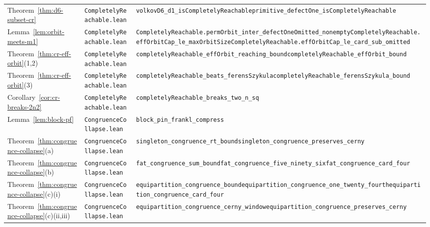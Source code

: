 \documentclass[11pt,a4paper]{article}
\theoremstyle{definition}
\theoremstyle{remark}
\begin{document}
\begin{table}[ht]
\begin{tabular}{@{}>{\raggedright\arraybackslash}p{2.75cm}>{\raggedright\arraybackslash}p{3.65cm}>{\raggedright\arraybackslash}p{9.05cm}@{}}
\midrule
Theorem~\ref{thm:d6-subset-cr} & \texttt{CompletelyReachable.lean} & \texttt{volkovD6\_d1\_isCompletelyReachable}\newline \texttt{primitive\_defectOne\_isCompletelyReachable} \\
Lemma~\ref{lem:orbit-meets-m1} & \texttt{CompletelyReachable.lean} & \texttt{CompletelyReachable.permOrbit\_inter\_defectOneOmitted\_nonempty}\newline \texttt{CompletelyReachable.effOrbitCap\_le\_maxOrbitSize}\newline \texttt{CompletelyReachable.effOrbitCap\_le\_card\_sub\_omitted} \\
Theorem~\ref{thm:cr-eff-orbit}(1,2) & \texttt{CompletelyReachable.lean} & \texttt{completelyReachable\_effOrbit\_reaching\_bound}\newline \texttt{completelyReachable\_effOrbit\_bound} \\
Theorem~\ref{thm:cr-eff-orbit}(3) & \texttt{CompletelyReachable.lean} & \texttt{completelyReachable\_beats\_ferensSzykula}\newline \texttt{completelyReachable\_ferensSzykula\_bound} \\
Corollary~\ref{cor:cr-breaks-2n2} & \texttt{CompletelyReachable.lean} & \texttt{completelyReachable\_breaks\_two\_n\_sq} \\
\midrule
Lemma~\ref{lem:block-pf} & \texttt{CongruenceCollapse.lean} & \texttt{block\_pin\_frankl\_compress} \\
Theorem~\ref{thm:congruence-collapse}(a) & \texttt{CongruenceCollapse.lean} & \texttt{singleton\_congruence\_rt\_bound}\newline \texttt{singleton\_congruence\_preserves\_cerny} \\
Theorem~\ref{thm:congruence-collapse}(b) & \texttt{CongruenceCollapse.lean} & \texttt{fat\_congruence\_sum\_bound}\newline \texttt{fat\_congruence\_five\_ninety\_six}\newline \texttt{fat\_congruence\_card\_four} \\
Theorem~\ref{thm:congruence-collapse}(c)(i) & \texttt{CongruenceCollapse.lean} & \texttt{equipartition\_congruence\_bound}\newline \texttt{equipartition\_congruence\_one\_twenty\_fourth}\newline \texttt{equipartition\_congruence\_card\_four} \\
Theorem~\ref{thm:congruence-collapse}(c)(ii,iii) & \texttt{CongruenceCollapse.lean} & \texttt{equipartition\_congruence\_cerny\_window}\newline \texttt{equipartition\_congruence\_preserves\_cerny} \\

\end{tabular}
\end{table}
\end{document}
